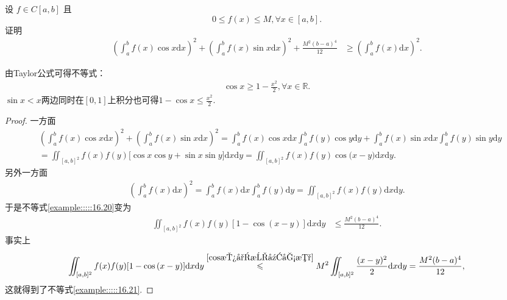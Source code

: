 \documentclass[../../main.tex]{subfiles}
\begin{document}
\begin{example}
设 $f \in C[a,b]$ 且
\[0 \leqslant f(x) \leqslant M, \forall x \in [a,b].\]
证明
\begin{align}\label{example:::::16.20}
\left(\int_{a}^{b}f(x)\cos x\mathrm{d}x\right)^2 + \left(\int_{a}^{b}f(x)\sin x\mathrm{d}x\right)^2 + \frac{M^2(b - a)^4}{12} &\geqslant \left(\int_{a}^{b}f(x)\mathrm{d}x\right)^2.
\end{align}
\end{example}
\begin{remark}
由Taylor公式可得不等式：
\begin{align}\label{cos放小成幂函数}
\cos x\geqslant  1-\frac{x^2}{2},\forall x\in \mathbb{R}.
\end{align}
$\sin x<x$两边同时在$[0,1]$上积分也可得$1-\cos x\leqslant \frac{x^2}{2}$.
\end{remark}
\begin{proof}
一方面
\begin{align*}
&\left( \int_a^b{f(x)\cos x\mathrm{d}x} \right) ^2+\left( \int_a^b{f(x)\sin x\mathrm{d}x} \right) ^2=\int_a^b{f(x)\cos x\mathrm{d}x}\int_a^b{f(y)\cos y\mathrm{d}y}+\int_a^b{f(x)\sin x\mathrm{d}x}\int_a^b{f(y)\sin y\mathrm{d}y}
\\
&=\iint_{[a,b]^2}{f(x)f(y)[\cos x\cos y}+\sin x\sin y]\mathrm{d}x\mathrm{d}y=\iint_{[a,b]^2}{f(x)f(y)\cos\mathrm{(}x}-y)\mathrm{d}x\mathrm{d}y.
\end{align*}
另外一方面
\begin{align*}
\left( \int_a^b{f(x)\mathrm{d}x} \right) ^2=\int_a^b{f(x)\mathrm{d}x}\int_a^b{f(y)\mathrm{d}y}=\iint_{[a,b]^2}{f(x)f(y)\mathrm{d}x\mathrm{d}y.}
\end{align*}
于是不等式\eqref{example:::::16.20}变为
\begin{align}\label{example:::::16.21}
\iint_{[a,b]^2}f(x)f(y)[1 - \cos(x - y)]\mathrm{d}x\mathrm{d}y &\leqslant \frac{M^2(b - a)^4}{12}.
\end{align}
事实上
\begin{align*}
\iint_{[a,b]^2}{f(x)f(y)[1}-\cos\mathrm{(}x-y)]\mathrm{d}x\mathrm{d}y\overset{\eqref{cos放小成幂函数}}{\leqslant}M^2\iint_{[a,b]^2}{\frac{(x-y)^2}{2}\mathrm{d}x\mathrm{d}y}=\frac{M^2(b-a)^4}{12},
\end{align*}
这就得到了不等式\eqref{example:::::16.21}. 

\end{proof}
\end{document}
